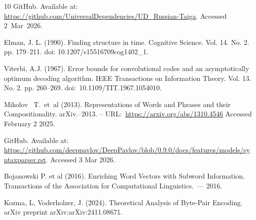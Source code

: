 \documentclass[11pt,twocolumn]{article}
\begin{document}
\begin{thebibliography}{10}
  GitHub. Available at: \href{https://github.com/UniversalDependencies/UD\_Russian-Taiga}{https://github.com{\slash}UniversalDependencies{\slash}UD\_Russian-Taiga}.
  Accessed 2~Mar~2026.

  Elman, J. L. (1990).
  Finding structure in time. Cognitive Science. Vol. 14. No. 2. pp. 179--211. doi: 10.1207{\slash}s15516709cog1402\_1.
  
  Viterbi, A.J. (1967).
  Error bounds for convolutional codes and an asymptotically
  optimum decoding algorithm.
  IEEE Transactions on Information Theory. Vol. 13. No. 2. pp. 260--269.
  doi:~10.1109{\slash}TIT.1967.1054010.

  Mikolov~  T.~et~al (2013).
  Representations of Words and Phrases and their Compositionality.
  arXiv.--2013. -- URL:~\href{https://arxiv.org/abs/1310.4546}{https://arxiv.org{\slash}abs{\slash}1310.4546}
  Accessed February 2 2025.

  GitHub. Available at: \href{https://github.com/deeppavlov/DeepPavlov/blob/0.9.0/docs/features/models/syntaxparser.rst}{https://github.com{\slash}deeppavlov{\slash}DeepPavlov{\slash}blob{\slash}0.9.0{\slash}docs{\slash}features{\slash}models{\slash}syntaxparser.rst}. Accessed 3 Mar 2026.


Bojanowski   P. et al (2016).
    Enriching Word Vectors with Subword Information.
    Transactions of the Association for Computational Linguistics.~--- 2016.

Kozma, L, Voderholzer, J. (2024).
    Theoretical Analysis of Byte-Pair Encoding.
    arXiv preprint arXiv:arXiv:2411.08671.

\end{thebibliography}
\end{document}

